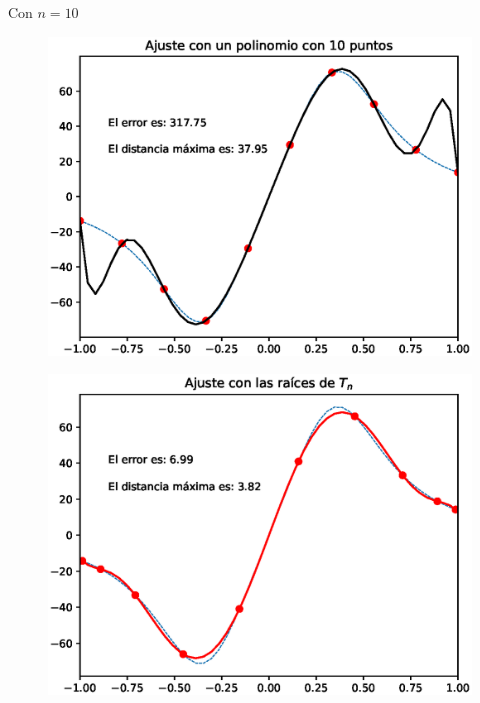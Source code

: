 \newpage
Con $n = 10$
\\
\begin{minipage}{0.45\linewidth}
    \begin{figure}[H]
    \centering
    \includegraphics[scale=0.44]{Imagenes/Interpolacion_Chebychev_10_Polinomio.eps}
    \end{figure}       
\end{minipage}
\hspace{0.1cm}
\begin{minipage}{0.45\linewidth}
\begin{figure}[H]
    \centering
    \includegraphics[scale=0.44]{Imagenes/Interpolacion_Chebychev_10_Raices.eps}
\end{figure}
\end{minipage}

